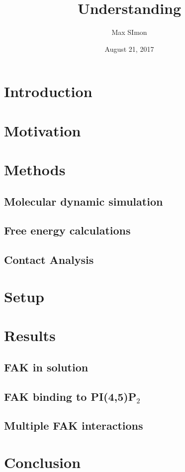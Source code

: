 \documentclass[
11pt, %
parskip=half, %
digital, %
oneside, %
]{bsc}
\title{Understanding}
\author{Max SImon}
\date{August 21, 2017}
\newcommand{\pip}{PI(4,5)P$_2$}
\begin{document}
	
\chapter{Introduction}
%
\chapter{Motivation}
%
\chapter{Methods}
\section{Molecular dynamic simulation}
%
\section{Free energy calculations}
%
\section{Contact Analysis}
%
\chapter{Setup}
%
\chapter{Results}
\section{FAK in solution}
%
\section{FAK binding to \pip{}}
%
%
%
\section{Multiple FAK interactions}
%
\chapter{Conclusion}

\end{document}

